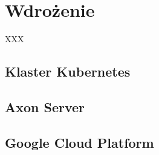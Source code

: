 \clearpage %

\section{Wdrożenie}

XXX

\subsection{Klaster Kubernetes}

\subsection{Axon Server}

\subsection{Google Cloud Platform}